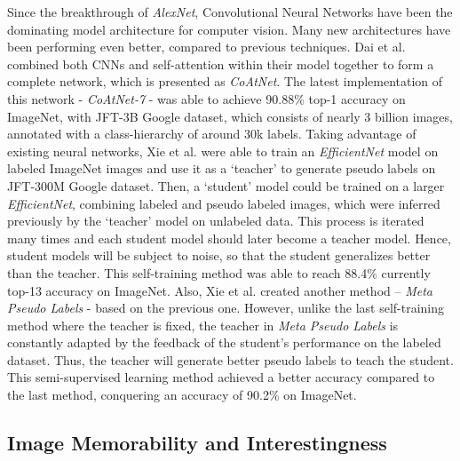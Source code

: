 \documentclass{article}
\begin{document}
Since the breakthrough of \textit{AlexNet}, Convolutional Neural Networks have been the dominating model architecture for computer vision. Many new architectures have been performing even better, compared to previous techniques. Dai et al. \cite{DBLP:journals/corr/abs-2106-04803} combined both CNNs and self-attention within their model together to form a complete network, which is presented as \textit{CoAtNet}. The latest implementation of this network - \textit{CoAtNet-7} - was able to achieve 90.88\% top-1 accuracy on ImageNet, with JFT-3B Google dataset, which consists of nearly 3 billion images, annotated with a class-hierarchy of around 30k labels. Taking advantage of existing neural networks, Xie et al. \cite{DBLP:journals/corr/abs-1911-04252} were able to train an \textit{EfficientNet} model \cite{Tan2019EfficientNetRM} on labeled ImageNet images and use it as a ‘teacher’ to generate pseudo labels on JFT-300M Google dataset. Then, a ‘student’ model could be trained on a larger \textit{EfficientNet}, combining labeled and pseudo labeled images, which were inferred previously by the ‘teacher’ model on unlabeled data. This process is iterated many times and each student model should later become a teacher model. Hence, student models will be subject to noise, so that the student generalizes better than the teacher. This self-training method was able to reach 88.4\% currently top-13 accuracy on ImageNet. Also, Xie et al. \cite{DBLP:journals/corr/abs-2003-10580} created another method – \textit{Meta Pseudo Labels} - based on the previous one. However, unlike the last self-training method where the teacher is fixed, the teacher in \textit{Meta Pseudo Labels} is constantly adapted by the feedback of the student’s performance on the labeled dataset. Thus, the teacher will generate better pseudo labels to teach the student. This semi-supervised learning method achieved a better accuracy compared to the last method, conquering an accuracy of 90.2\% on ImageNet.

\subsection{Image Memorability and Interestingness}
\end{document}
